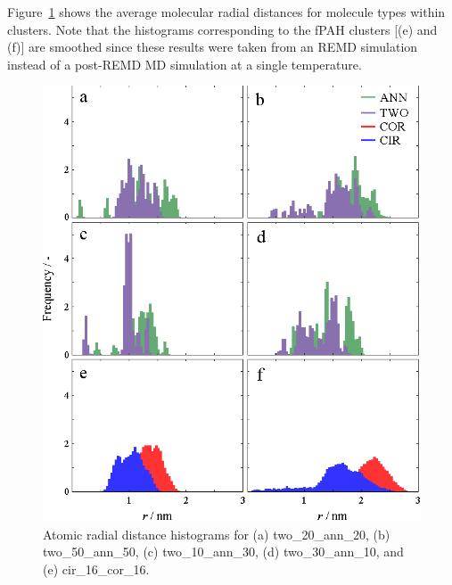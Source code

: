 Figure~\ref{figSI:radialdists_molec} shows the average molecular radial distances for molecule types within clusters. Note that the histograms corresponding to the fPAH clusters [(e) and (f)] are smoothed since these results were taken from an REMD simulation instead of a post-REMD MD simulation at a single temperature.
%
\begin{figure}[!tbh]
\centering
\includegraphics[width=0.5\linewidth]{Figures/molec_histograms.eps}
\caption{Atomic radial distance histograms for (a) two\_20\_ann\_20, (b) two\_50\_ann\_50, (c) two\_10\_ann\_30, (d) two\_30\_ann\_10, and (e) cir\_16\_cor\_16.}
\label{figSI:radialdists_molec}
\end{figure}
%

\newpage